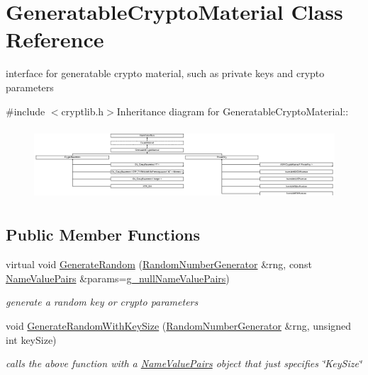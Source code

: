 \hypertarget{class_generatable_crypto_material}{
\section{GeneratableCryptoMaterial Class Reference}
\label{class_generatable_crypto_material}
}


interface for generatable crypto material, such as private keys and crypto parameters  


{\ttfamily \#include $<$cryptlib.h$>$}Inheritance diagram for GeneratableCryptoMaterial::\begin{figure}[H]
\begin{center}
\leavevmode
\includegraphics[height=2.70968cm]{class_generatable_crypto_material}
\end{center}
\end{figure}
\subsection*{Public Member Functions}
\begin{DoxyCompactItemize}
\item 
virtual void \hyperlink{class_generatable_crypto_material_abe368b52db1ca7079b690f2d6e605f7a}{GenerateRandom} (\hyperlink{class_random_number_generator}{RandomNumberGenerator} \&rng, const \hyperlink{class_name_value_pairs}{NameValuePairs} \&params=\hyperlink{cryptlib_8h_ab1b0f7d11a21c6163be8ca2662ce2ac6}{g\_\-nullNameValuePairs})
\begin{DoxyCompactList}\small\item\em generate a random key or crypto parameters \item\end{DoxyCompactList}\item 
\hypertarget{class_generatable_crypto_material_a38d492343c32e530a5c2781b5797f755}{
void \hyperlink{class_generatable_crypto_material_a38d492343c32e530a5c2781b5797f755}{GenerateRandomWithKeySize} (\hyperlink{class_random_number_generator}{RandomNumberGenerator} \&rng, unsigned int keySize)}
\label{class_generatable_crypto_material_a38d492343c32e530a5c2781b5797f755}

\begin{DoxyCompactList}\small\item\em calls the above function with a \hyperlink{class_name_value_pairs}{NameValuePairs} object that just specifies \char`\"{}KeySize\char`\"{} \item\end{DoxyCompactList}\end{DoxyCompactItemize}



